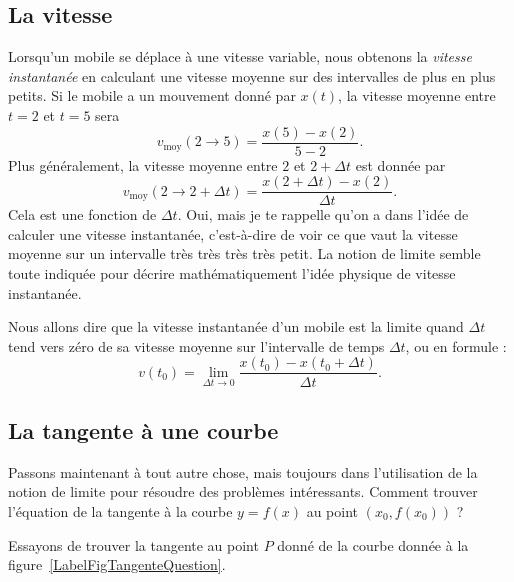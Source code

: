 \subsection{La vitesse}

Lorsqu'un mobile se déplace à une vitesse variable, nous obtenons la \emph{vitesse instantanée} en calculant une vitesse moyenne sur des intervalles de plus en plus petits. Si le mobile a un mouvement donné par $x(t)$, la vitesse moyenne entre $t=2$ et $t=5$ sera
\[
  v_{\text{moy}}(2\to 5)=\frac{ x(5)-x(2) }{ 5-2 }.
\]
Plus généralement, la vitesse moyenne entre $2$ et $2+\Delta t$ est donnée par
\[
  v_{\text{moy}}(2\to 2+\Delta t)=\frac{ x(2+\Delta t)-x(2) }{ \Delta t }.
\]
Cela est une fonction de $\Delta t$. Oui, mais je te rappelle qu'on a dans l'idée de calculer une vitesse instantanée, c'est-à-dire de voir ce que vaut la vitesse moyenne sur un intervalle très {\small très} {\footnotesize très} {\scriptsize très} {\tiny petit}. La notion de limite semble toute indiquée pour décrire mathématiquement l'idée physique de vitesse instantanée.

Nous allons dire que la vitesse instantanée d'un mobile est la limite quand $\Delta t$ tend vers zéro de sa vitesse moyenne sur l'intervalle de temps $\Delta t$, ou en formule :
\begin{equation}		\label{Eqvinstlimite}
	v(t_0)=\lim_{\Delta t\to 0}\frac{ x(t_0)-x(t_0+\Delta t) }{ \Delta t }.
\end{equation}

\subsection{La tangente à une courbe}

Passons maintenant à tout autre chose, mais toujours dans l'utilisation de la notion de limite pour résoudre des problèmes intéressants. Comment trouver l'équation de la tangente à la courbe $y=f(x)$ au point $(x_0,f(x_0))$ ?

Essayons de trouver la tangente au point $P$ donné de la courbe donnée à la figure~\ref{LabelFigTangenteQuestion}.

\newcommand{\CaptionFigTangenteQuestion}{Comment trouver la tangente à la courbe au point $P$ ?}


